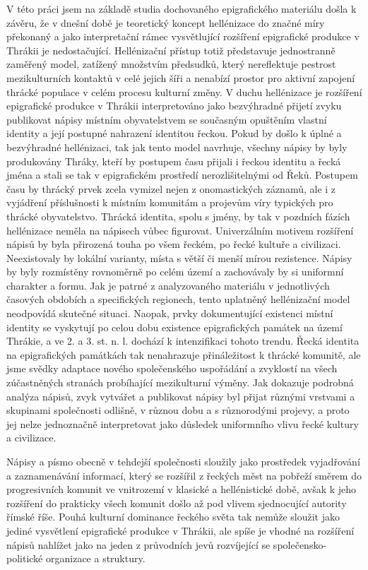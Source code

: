 V této práci jsem na základě studia dochovaného epigrafického materiálu došla k závěru, že v dnešní době je teoretický koncept hellénizace do značné míry překonaný a jako interpretační rámec vysvětlující rozšíření epigrafické produkce v Thrákii je nedostačující. Hellénizační přístup totiž představuje jednostranně zaměřený model, zatížený množstvím předsudků, který nereflektuje pestrost mezikulturních kontaktů v celé jejich šíři a nenabízí prostor pro aktivní zapojení thrácké populace v celém procesu kulturní změny. V duchu hellénizace je rozšíření epigrafické produkce v Thrákii interpretováno jako bezvýhradné přijetí zvyku publikovat nápisy místním obyvatelstvem se současným opuštěním vlastní identity a její postupné nahrazení identitou řeckou. Pokud by došlo k úplné a bezvýhradné hellénizaci, tak jak tento model navrhuje, všechny nápisy by byly produkovány Thráky, kteří by postupem času přijali i řeckou identitu a řecká jména a stali se tak v epigrafickém prostředí nerozlišitelnými od Řeků. Postupem času by thrácký prvek zcela vymizel nejen z onomastických záznamů, ale i z vyjádření příslušnosti k místním komunitám a projevům víry typických pro thrácké obyvatelstvo. Thrácká identita, spolu s jmény, by tak v pozdních fázích hellénizace neměla na nápisech vůbec figurovat. Univerzálním motivem rozšíření nápisů by byla přirozená touha po všem řeckém, po řecké kultuře a civilizaci. Neexistovaly by lokální varianty, místa s větší či menší mírou rezistence. Nápisy by byly rozmístěny rovnoměrně po celém území a zachovávaly by si uniformní charakter a formu. Jak je patrné z analyzovaného materiálu v jednotlivých časových obdobích a specifických regionech, tento uplatněný hellénizační model neodpovídá skutečné situaci. Naopak, prvky dokumentující existenci místní identity se vyskytují po celou dobu existence epigrafických památek na území Thrákie, a ve 2. a 3. st. n. l. dochází k intenzifikaci tohoto trendu. Řecká identita na epigrafických památkách tak nenahrazuje přináležitost k thrácké komunitě, ale jsme svědky adaptace nového společenského uspořádání a zvyklostí na všech zúčastněných stranách probíhající mezikulturní výměny. Jak dokazuje podrobná analýza nápisů, zvyk vytvářet a publikovat nápisy byl přijat různými vrstvami a skupinami společnosti odlišně, v různou dobu a s různorodými projevy, a proto jej nelze jednoznačně interpretovat jako důsledek uniformního vlivu řecké kultury a civilizace.

Nápisy a písmo obecně v tehdejší společnosti sloužily jako prostředek vyjadřování a zaznamenávání informací, který se rozšířil z řeckých měst na pobřeží směrem do progresivních komunit ve vnitrozemí v klasické a hellénistické době, avšak k jeho rozšíření do prakticky všech komunit došlo až pod vlivem sjednocující autority římské říše. Pouhá kulturní dominance řeckého světa tak nemůže sloužit jako jediné vysvětlení epigrafické produkce v Thrákii, ale spíše je vhodné na rozšíření nápisů nahlížet jako na jeden z průvodních jevů rozvíjející se společensko-politické organizace a struktury.

